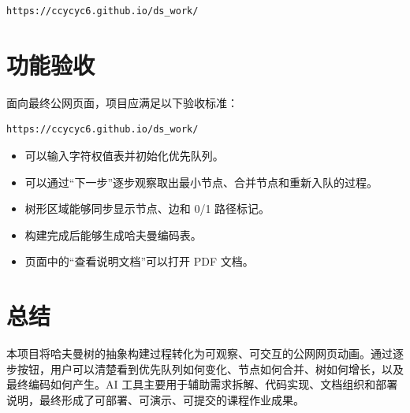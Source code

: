 \documentclass[UTF8,a4paper,12pt]{ctexart}
\begin{document}
\begin{lstlisting}
https://ccycyc6.github.io/ds_work/
\end{lstlisting}

\section{功能验收}

面向最终公网页面，项目应满足以下验收标准：

\begin{lstlisting}
https://ccycyc6.github.io/ds_work/
\end{lstlisting}

\begin{itemize}
  \item 可以输入字符权值表并初始化优先队列。
  \item 可以通过“下一步”逐步观察取出最小节点、合并节点和重新入队的过程。
  \item 树形区域能够同步显示节点、边和 0/1 路径标记。
  \item 构建完成后能够生成哈夫曼编码表。
  \item 页面中的“查看说明文档”可以打开 PDF 文档。
\end{itemize}

\section{总结}

本项目将哈夫曼树的抽象构建过程转化为可观察、可交互的公网网页动画。通过逐步按钮，用户可以清楚看到优先队列如何变化、节点如何合并、树如何增长，以及最终编码如何产生。AI 工具主要用于辅助需求拆解、代码实现、文档组织和部署说明，最终形成了可部署、可演示、可提交的课程作业成果。
\end{document}
